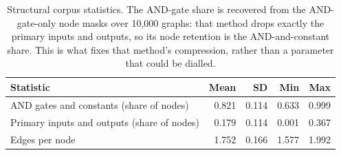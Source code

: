 \begin{table}[htbp]
\centering
\caption{Structural corpus statistics. The AND-gate share is recovered from the AND-gate-only node masks over 10,000 graphs: that method drops exactly the primary inputs and outputs, so its node retention is the AND-and-constant share. This is what fixes that method's compression, rather than a parameter that could be dialled.}
\label{tab:dataset_structure}
\small
\begin{tabular}{lrrrr}
\toprule
\textbf{Statistic} & \textbf{Mean} & \textbf{SD} & \textbf{Min} & \textbf{Max} \\
\midrule
AND gates and constants (share of nodes) & 0.821 & 0.114 & 0.633 & 0.999 \\
Primary inputs and outputs (share of nodes) & 0.179 & 0.114 & 0.001 & 0.367 \\
Edges per node & 1.752 & 0.166 & 1.577 & 1.992 \\
\bottomrule
\end{tabular}
\end{table}
